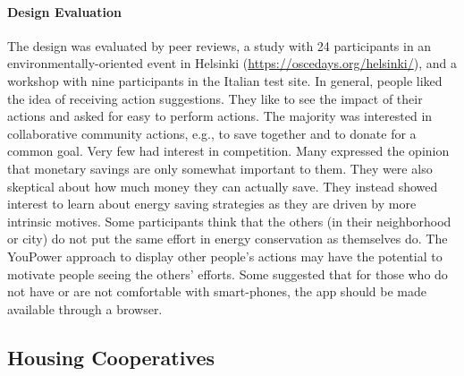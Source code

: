 \paragraph{Design Evaluation}
The design was evaluated by peer reviews, a study with 24 participants 
in an environmentally-oriented event in Helsinki (\url{https://oscedays.org/helsinki/}), 
and a workshop with nine participants in the Italian test site. 
% 
In general, people liked the idea of receiving action suggestions. 
They like to see the impact of their actions and asked for easy to perform actions. 
The majority was interested in collaborative community actions, e.g., to save together and to donate for a common goal. Very few had interest in competition. 
% 
% 
% 
Many expressed the opinion that monetary savings are only somewhat important to them. They were also skeptical about how much money they can actually save. They instead showed interest to learn about energy saving strategies as they are driven by more intrinsic motives.
% 
Some participants think that the others (in their neighborhood or city) do not put the same effort in energy conservation as themselves do. The YouPower approach to display other people's actions may have the potential to motivate people seeing the others' efforts.
%
Some suggested that for those who do not have or are not comfortable with smart-phones, the app should be made available through a browser. 


\subsection{Housing Cooperatives}
\label{sect:brf}

